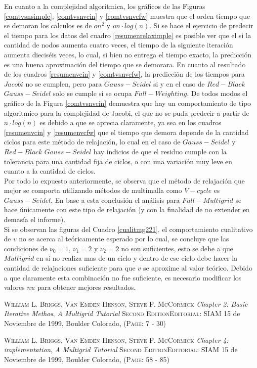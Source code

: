 \documentclass[letter,10pt]{article}
\begin{document}
\indent En cuanto a la complejidad algoritmica, los gráficos de las Figuras \ref{comtvsnsimple}, \ref{comtvsnvcin} y \ref{comtvsnvcfw} muestra que el orden tiempo que se demoran los calculos es de $o{n^2}$ y $o{n\cdot log(n)}$. Si se hace el ejercicio de predecir el tiempo para los datos del cuadro \ref{resumenrelaximple} es posible ver que el si la cantidad de nodos aumenta cuatro veces, el tiempo de la siguiente iteración aumenta dieciséis veces, lo cual, si bien no entrega el tiempo exacto, la predicción es una buena aproximación del tiempo que se demorara. En cuanto al resultado de los cuadros \ref{resumenvcin} y \ref{comtvsnvcfw}, la predicción de los tiempos para $Jacobi$ no se cumplen, pero para $Gauss-Seidel$ si y en el caso de $Red-Black$ $Gauss-Seidel$ solo se cumple si se ocupa $Full-Weighting$. De todos modos el gráfico de la Figura \ref{comtvsnvcin} demuestra que hay un comportamiento de tipo algoritmico para la complejidad de Jacobi, el que no se puda predecir a partir de $n\cdot log(n) $ es debido a que se aprecia claramente, ya sea en los cuadros \ref{resumenvcin} y \ref{resumenvcfw} que el tiempo que demora depende de la cantidad ciclos para este método de relajación, lo cual en el caso de $Gauss-Seidel$ y $Red-Black$ $Gauss-Seidel$ hay indicios de que el residuo cumple con la tolerancia para una cantidad fija de ciclos, o con una variación muy leve en cuanto a la cantidad de ciclos.\\
\indent Por todo lo expuesto anteriormente, se observa que el método de relajación que mejor se comporta utilizando métodos de multimalla como $V-cycle$ es $Gauss-Seidel$. En base a esta conclusión el análisis para $Full-Multigrid$ se hace únicamente con este tipo de relajación (y con la finalidad de no extender en demasía el informe).\\
\indent Si se observan las figuras del Cuadro \ref{cualitmg221}, el comportamiento cualitativo de $v$ no se acerca al teóricamente esperado por lo cual, se concluye que las condiciones de $\nu_0=1$, $\nu_1=2$ y $\nu_2=2$ no son suficientes, esto se debe a que $Multigrid$ en si no realiza mas de un ciclo y dentro de ese ciclo debe hacer la cantidad de relajaciones suficiente para que $v$ se aproxime al valor teórico. Debido a que claramente esta combinación no fue suficiente, es necesario modificar los valores $nu$ para obtener mejores resultados.


\newpage

\begin{thebibliography}{9}
\textsc{William L. Briggs, Van Emden Henson, Steve F. McCormick} \textit{Chapter 2: Basic Iterative Methos}, \textit{A Multigrid Tutorial} \textsc{Second Edition}\textsc{Editorial: SIAM} 15 de Noviembre de 1999, Boulder Colorado, \textsc{(Page: 7 - 30)}

\textsc{William L. Briggs, Van Emden Henson, Steve F. McCormick} \textit{Chapter 4: implementation}, \textit{A Multigrid Tutorial} \textsc{Second Edition}\textsc{Editorial: SIAM} 15 de Noviembre de 1999, Boulder Colorado, \textsc{(Page: 58 - 85)}

\end{thebibliography}
\end{document}
